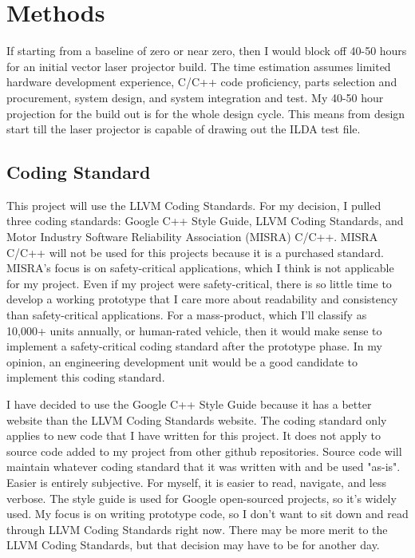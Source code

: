 \documentclass[journal]{IEEEtran}
\begin{document}
    \section{Methods}

    If starting from a baseline of zero or near zero, then I would block off 40-50 hours for an initial vector laser projector build. 
    The time estimation assumes limited hardware development experience, C/C++ code proficiency, parts selection and procurement, system design, and system integration and test.
    My 40-50 hour projection for the build out is for the whole design cycle. 
    This means from design start till the laser projector is capable of drawing out the ILDA test file.

    \subsection {Coding Standard}
    This project will use the LLVM Coding Standards. 
    For my decision, I pulled three coding standards: Google C++ Style Guide, LLVM Coding Standards, and Motor Industry Software Reliability Association (MISRA) C/C++.
    MISRA C/C++ will not be used for this projects because it is a purchased standard.
    MISRA's focus is on safety-critical applications, which I think is not applicable for my project.
    Even if my project were safety-critical, there is so little time to develop a working prototype that I care more about readability and consistency than safety-critical applications.
    For a mass-product, which I'll classify as 10,000+ units annually, or human-rated vehicle, then it would make sense to implement a safety-critical coding standard after the prototype phase.
    In my opinion, an engineering development unit would be a good candidate to implement this coding standard.

    I have decided to use the Google C++ Style Guide because it has a better website than the LLVM Coding Standards website.
    The coding standard only applies to new code that I have written for this project.
    It does not apply to source code added to my project from other github repositories.
    Source code will maintain whatever coding standard that it was written with and be used "as-is".
    Easier is entirely subjective. For myself, it is easier to read, navigate, and less verbose.
    The style guide is used for Google open-sourced projects, so it's widely used.
    My focus is on writing prototype code, so I don't want to sit down and read through LLVM Coding Standards right now.
    There may be more merit to the LLVM Coding Standards, but that decision may have to be for another day.
\end{document}
